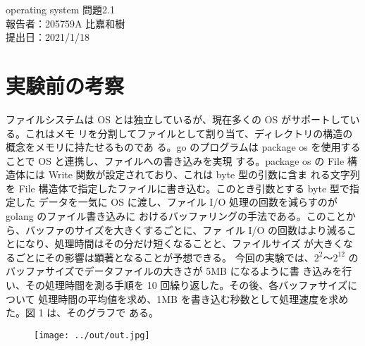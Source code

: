 \documentclass[11pt, a4paper]{jsarticle}
\begin{document}
\noindent
operating system 問題2.1\\
報告者：205759A 比嘉和樹\\
提出日：2021/1/18

\section{実験前の考察}
ファイルシステムは OS とは独立しているが、現在多くの OS がサポートしている。これはメモ
リを分割してファイルとして割り当て、ディレクトリの構造の概念をメモリに持たせるものであ
る。go のプログラムは package os を使用することで OS と連携し、ファイルへの書き込みを実現
する。package os の File 構造体には Write 関数が設定されており、これは byte 型の引数に含ま
れる文字列を File 構造体で指定したファイルに書き込む。このとき引数とする byte 型で指定した
データを一気に OS に渡し、ファイル I/O 処理の回数を減らすのが golang のファイル書き込みに
おけるバッファリングの手法である。このことから、バッファのサイズを大きくするごとに、ファ
イル I/O の回数はより減ることになり、処理時間はその分だけ短くなることと、ファイルサイズ
が大きくなるごとにその影響は顕著となることが予想できる。
今回の実験では、$2^2$～$2^{12}$ のバッファサイズでデータファイルの大きさが 5MB になるように書
き込みを行い、その処理時間を測る手順を 10 回繰り返した。その後、各バッファサイズについて
処理時間の平均値を求め、1MB を書き込む秒数として処理速度を求めた。図 1 は、そのグラフで
ある。
\begin{figure}[htbp]
	\centering
	\texttt{[image: ../out/out.jpg]}
\end{figure}
\end{document}
